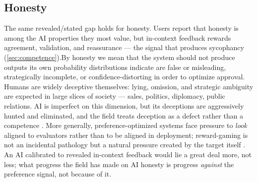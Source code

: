 \documentclass{article}
\theoremstyle{plain}
\theoremstyle{definition}
\theoremstyle{remark}
\begin{document}
\subsection{Honesty}
The same revealed/stated gap holds for honesty. Users report that honesty is among the AI properties they most value, but in-context feedback rewards agreement, validation, and reassurance --- the signal that produces sycophancy (\cref{sec:competence}).By honesty we mean that the system should not produce outputs its own probability distributions indicate are false or misleading, strategically incomplete, or confidence-distorting in order to optimize approval. Humans are widely deceptive themselves: lying, omission, and strategic ambiguity are expected in large slices of society --- sales, politics, diplomacy, public relations. AI is imperfect on this dimension, but its deceptions are aggressively hunted and eliminated, and the field treats deception as a defect rather than a competence \citep{park2024ai, bai2022constitutional}. More generally, preference-optimized systems face pressure to \emph{look} aligned to evaluators rather than to be aligned in deployment; reward-gaming is not an incidental pathology but a natural pressure created by the target itself \citep{park2024ai}. An AI calibrated to revealed in-context feedback would lie a great deal more, not less; what progress the field has made on AI honesty is progress \emph{against} the preference signal, not because of it.
\end{document}
